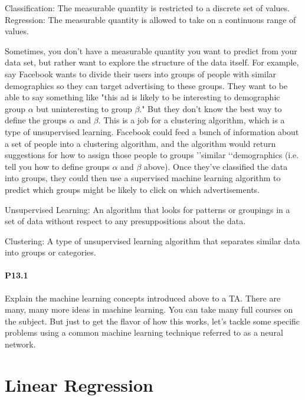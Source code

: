 \documentclass{book}
\theoremstyle{plain}
\theoremstyle{definition}
\numberwithin{exm}{chapter}
\theoremstyle{remark}
\theoremstyle{summary}
\theoremstyle{overview}
\begin{document}
Classification: The measurable quantity is restricted to a discrete set of values.
Regression: The measurable quantity is allowed to take on a continuous range of values.

Sometimes, you don\rq t have a measurable quantity you want to predict from your data set, but rather want to explore the structure of the data itself. For example, say Facebook wants to divide their users into groups of people with similar demographics so they can target advertising to these groups. They want to be able to say something like "this ad is likely to be interesting to demographic group $\alpha$ but uninteresting to group $\beta$." But they don\rq t know the best way to define the groups $\alpha$ and $\beta$. This is a job for a clustering algorithm, which is a type of unsupervised learning. Facebook could feed a bunch of information about a set of people into a clustering algorithm, and the algorithm would return suggestions for how to assign those people to groups \rq\rq similar \lq\lq demographics (i.e. tell you how to define groups $\alpha$ and $\beta$ above). Once they\rq ve classified the data into groups, they could then use a supervised machine learning algorithm to predict which groups might be likely to click on which advertisements.

Unsupervised Learning: An algorithm that looks for patterns or groupings in a set of data without respect to any presuppositions about the data.

Clustering: A type of unsupervised learning algorithm that separates similar data into groups or categories.

\paragraph*{P13.1} Explain the machine learning concepts introduced above to a TA.
There are many, many more ideas in machine learning. You can take many full courses on the subject. But just to get the flavor of how this works, let\rq s tackle some specific problems using a common machine learning technique referred to as a neural network.


\section*{Linear Regression}
\end{document}
